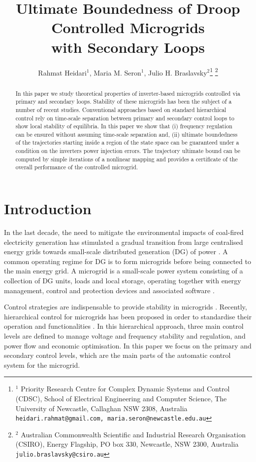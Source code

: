 \documentclass[letter, 10pt, conference]{ieeeconf}
\title{Ultimate Boundedness of Droop Controlled Microgrids \\with
  Secondary Loops}
\author{Rahmat Heidari$^{1}$, Maria M.  Seron$^{1}$, Julio
 H. Braslavsky$^{2}$\thanks{$^{1}$ Priority Research Centre for Complex Dynamic Systems
   and Control (CDSC), School of Electrical Engineering and Computer
   Science, The University of Newcastle, Callaghan NSW 2308,
   Australia {\tt\scriptsize heidari.rahmat@gmail.com, 
     maria.seron@newcastle.edu.au}} \thanks{$^{2}$ Australian Commonwealth Scientific and Industrial
   Research Organisation (CSIRO),  Energy Flagship,
   PO box 330, Newcastle, NSW 2300, Australia {\tt\scriptsize
     julio.braslavsky@csiro.au}} }
\newcommand{\1}{\mathbf{1}}
\newcommand{\0}{\mathbf{0}}
\begin{document}
\maketitle
\thispagestyle{empty}
\pagestyle{empty}


\begin{abstract}
  In this paper we study theoretical properties of inverter-based
  microgrids controlled via primary and secondary loops.
  Stability of these microgrids has been the subject of a number of 
  recent studies.  Conventional approaches based on standard hierarchical
  control rely on time-scale separation between primary and secondary
  control loops to show local stability of equilibria. In this paper 
  we show that (i) frequency regulation can be ensured
  without assuming time-scale separation and, (ii) ultimate boundedness
  of the trajectories starting inside a region of the state space can be
  guaranteed under a condition on the inverters power injection
  errors. The trajectory ultimate bound can be computed by simple
  iterations of a nonlinear mapping and provides a certificate of the
  overall performance of the controlled microgrid.
\end{abstract}

\section{Introduction}
In the last decade, the need to mitigate the environmental impacts of
coal-fired electricity generation has stimulated a gradual transition
from large centralised energy grids towards small-scale distributed
generation (DG) of power \cite{Ustun2011}.  A common operating regime
for DG is to form microgrids before being connected to the main energy
grid.  A microgrid is a small-scale power system consisting of a
collection of DG units, loads and local storage, operating together
with energy management, control and protection devices and associated
software \cite{Lasseter01,PLT09}.

Control strategies are indispensable to provide stability in
microgrids \cite{PMM06}. Recently, hierarchical control for microgrids
has been proposed in order to standardise their operation and
functionalities \cite{GVMdVC11,Bidram2012}. In this hierarchical
approach, three main control levels are defined to manage voltage and
frequency stability and regulation, and power flow and economic
optimisation. In this paper we focus on the primary and secondary
control levels, which are the main parts of the automatic control
system for the microgrid.
\end{document}
